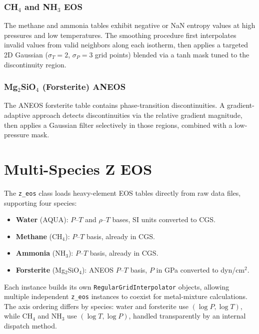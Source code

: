 \documentclass[twocolumn]{aastex701}
\begin{document}
\subsubsection{CH$_4$ and NH$_3$ EOS}
The methane and ammonia tables exhibit negative or NaN entropy values at high pressures and low temperatures.
The smoothing procedure first interpolates invalid values from valid neighbors along each isotherm, then applies a targeted 2D Gaussian ($\sigma_T = 2$, $\sigma_P = 3$ grid points) blended via a tanh mask tuned to the discontinuity region.

\subsubsection{Mg$_2$SiO$_4$ (Forsterite) ANEOS}
The ANEOS forsterite table contains phase-transition discontinuities.
A gradient-adaptive approach detects discontinuities via the relative gradient magnitude, then applies a Gaussian filter selectively in those regions, combined with a low-pressure mask.

\section{Multi-Species Z EOS}\label{sec:zeos}

The \texttt{z\_eos} class loads heavy-element EOS tables directly from raw data files, supporting four species:
\begin{itemize}
    \item \textbf{Water} (AQUA): $P$--$T$ and $\rho$--$T$ bases, SI units converted to CGS.
    \item \textbf{Methane} (CH$_4$): $P$--$T$ basis, already in CGS.
    \item \textbf{Ammonia} (NH$_3$): $P$--$T$ basis, already in CGS.
    \item \textbf{Forsterite} (Mg$_2$SiO$_4$): ANEOS $P$--$T$ basis, $P$ in GPa converted to dyn/cm$^2$.
\end{itemize}
Each instance builds its own \texttt{RegularGridInterpolator} objects, allowing multiple independent \texttt{z\_eos} instances to coexist for metal-mixture calculations.
The axis ordering differs by species: water and forsterite use $(\log P, \log T)$, while CH$_4$ and NH$_3$ use $(\log T, \log P)$, handled transparently by an internal dispatch method.

\end{document}

